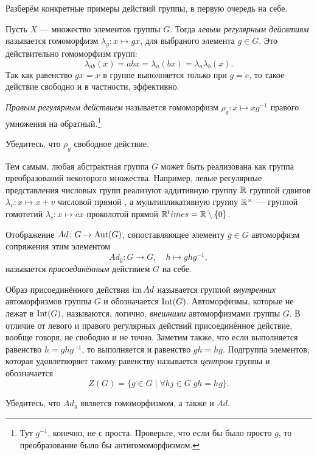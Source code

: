 Разберём конкретные примеры действий группы, в первую очередь на себе.
\begin{example}
    Пусть $X$ --- множество элементов группы $G$. Тогда \emph{левым регулярным дейсвтиям} называется гомоморфизм $\lambda_g: x \mapsto gx$, для выбраного элемента $g \in G$. Это действительно гомоморфизм групп: \[
        \lambda_{ab}(x) = abx = \lambda_a (bx) = \lambda_a \lambda_b (x).
    \]
    Так как равенство $gx = x$ в группе выполняется только при $g = e$, то такое действие свободно и в частности, эффективно.
    
    \emph{Правым регулярным действием} называется гомоморфизм $\rho_g: x \mapsto xg^{-1}$ правого умножения на обратный.\footnote{Тут $g^{-1}$, конечно, не с проста. Проверьте, что если бы было просто $g$, то преобразование было бы антигомоморфизмом.}

\end{example}
\begin{practice}
    Убедитесь, что $\rho_g$ свободное действие.
\end{practice}

Тем самым, любая абстрактная группа $G$ может быть реализована как группа преобразований некоторого множества. Например, левые регулярные представления числовых групп реализуют аддитивную группу $\mathbb R$ группой сдвигов $\lambda_v \colon x \mapsto x + v$ числовой прямой , а мультипликативную группу $\mathbb R^\times$ --- группой гомотетий $\lambda_c \colon x \mapsto cx$ проколотой прямой $\mathbb R^times = \mathbb R \setminus \{0\}$.

\begin{example}
    Отображение $Ad \colon G \to \operatorname{Aut}(G)$, сопоставляющее элементу $g\in G$ автоморфизм сопряжения этим элементом \[Ad_g \colon G \to G, \quad h \mapsto ghg^{-1},\] называется \emph{присоединённым} действием $G$ на себе.


    Образ присоединённого действия $\operatorname{im} Ad$ называется группой \emph{внутренних} автоморфизмов группы $G$ и обозначается $\operatorname{Int}(G)$. Автоморфизмы, которые не лежат в $\operatorname{Int}(G)$, называются, логично, \emph{внешними} автоморфизмами группы $G$. В отличие от левого и правого регулярных действий присоединённое действие, вообще говоря, не свободно и не точно. Заметим также, что если выполняется равенство $h = ghg^{-1}$, то выполняется и равенство $gh = hg$. Подгруппа элементов, которая удовлетворяет такому равенству называется \emph{центром} группы и обозначается \[Z(G) = \{g \in G \mid \forall hj \in G\; gh=hg\}.\]
\end{example}
\begin{practice}
    Убедитесь, что $Ad_g$ является гомоморфизмом, а также и $Ad$.
\end{practice}

